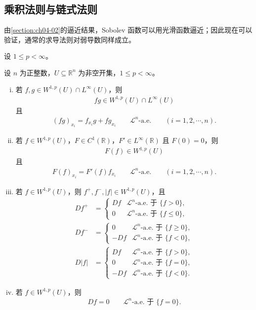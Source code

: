 \documentclass[../../main.tex]{subfiles}%
\begin{document}
\subsection{乘积法则与链式法则}\label{subsection:ch04-02-2}

由\cref{section:ch04-02}的逼近结果，Sobolev 函数可以用光滑函数逼近；因此现在可以验证，通常的求导法则对弱导数同样成立。%

设 $1\leqslant p<\infty$。

\begin{theorem}\label{theorem:ch04-4-4}
设 $n$ 为正整数，$U\subseteq\mathbb{R}^n$ 为非空开集，$1\leqslant p<\infty$。
\begin{enumerate}[(i)]
\item 若 $f,g\in W^{1,p}(U)\cap L^\infty(U)$，则
\begin{align*}
fg\in W^{1,p}(U)\cap L^\infty(U)
\end{align*}
且
\begin{align*}
(fg)_{x_i}=f_{x_i}g+fg_{x_i}\qquad\mathcal{L}^n\text{-a.e.}\qquad(i=1,2,\cdots,n).
\end{align*}
\item 若 $f\in W^{1,p}(U)$，$F\in C^1(\mathbb{R})$，$F'\in L^\infty(\mathbb{R})$ 且 $F(0)=0$，则
\begin{align*}
F(f)\in W^{1,p}(U)
\end{align*}
且
\begin{align*}
F(f)_{x_i}=F'(f)f_{x_i}\qquad\mathcal{L}^n\text{-a.e.}\qquad(i=1,2,\cdots,n).
\end{align*}
\item 若 $f\in W^{1,p}(U)$，则 $f^+,f^-,\lvert f\rvert\in W^{1,p}(U)$，且
\begin{align*}
Df^+&=
\begin{cases}
Df & \mathcal{L}^n\text{-a.e. 于 }\{f>0\},\\
0 & \mathcal{L}^n\text{-a.e. 于 }\{f\leqslant0\},
\end{cases}\\[4pt]
Df^-&=
\begin{cases}
0 & \mathcal{L}^n\text{-a.e. 于 }\{f\geqslant0\},\\
-Df & \mathcal{L}^n\text{-a.e. 于 }\{f<0\},
\end{cases}\\[4pt]
D\lvert f\rvert&=
\begin{cases}
Df & \mathcal{L}^n\text{-a.e. 于 }\{f>0\},\\
0 & \mathcal{L}^n\text{-a.e. 于 }\{f=0\},\\
-Df & \mathcal{L}^n\text{-a.e. 于 }\{f<0\}.
\end{cases}
\end{align*}
\item 若 $f\in W^{1,p}(U)$，则
\begin{align*}
Df=0\qquad\mathcal{L}^n\text{-a.e. 于 }\{f=0\}.
\end{align*}
\end{enumerate}
\end{theorem}
\end{document}

